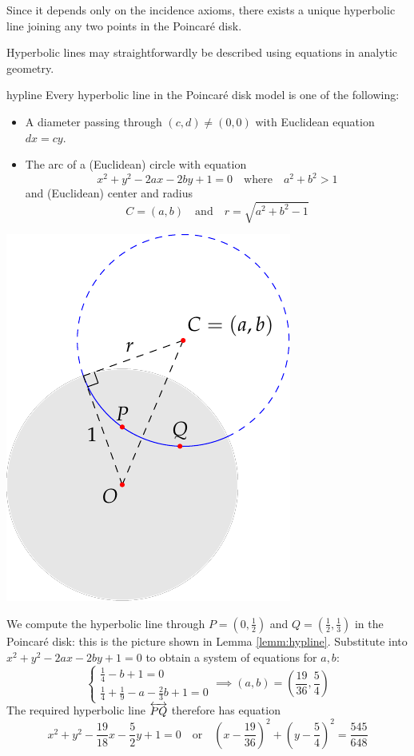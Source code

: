 Since it depends only on the incidence axioms, there exists a unique hyperbolic line joining any two points in the Poincaré disk.\par

Hyperbolic lines may straightforwardly be described using equations in analytic geometry.

\begin{lemm}[lower separated=false, sidebyside, sidebyside align=top seam, sidebyside gap=0pt, righthand width=0.35\linewidth]{}{hypline}
	Every hyperbolic line in the Poincaré disk model is one of the following:
	\begin{itemize}
	  \item A diameter passing through $(c,d)\neq (0,0)$ with Euclidean equation $dx=cy$.
	  \item The arc of a (Euclidean) circle with equation
		\[
			x^2+y^2-2ax-2by+1=0\quad\text{where}\quad a^2+b^2>1
		\]
		and (Euclidean) center and radius
		\[
			C=(a,b)\quad\text{and}\quad r=\sqrt{a^2+b^2-1}
		\]
	\end{itemize}
	\tcblower
	\flushright\includegraphics[scale=0.9]{models-example}
\end{lemm}
\goodbreak


\begin{example}{}{}
	We compute the hyperbolic line through $P=(0,\frac 12)$ and $Q=(\frac 12,\frac 13)$ in the Poincaré disk: this is the picture shown in Lemma \ref{lemm:hypline}.\smallbreak
	Substitute into $x^2+y^2-2ax-2by+1=0$ to obtain a system of equations for $a,b$:
	\[
		\begin{cases}
			\frac 14-b+1=0\\
			\frac 14+\frac 19-a-\frac 23b+1=0
		\end{cases}
		\implies (a,b)=\left(\frac{19}{36},\frac 54\right)
	\]
	The required hyperbolic line $\overleftrightarrow{PQ}$ therefore has equation
	\[
		x^2+y^2-\frac{19}{18}x-\frac{5}{2}y+1=0
		\quad\text{or}\quad
		\left(x-\frac{19}{36}\right)^2+\left(y-\frac 54\right)^2 =\frac{545}{648}
	\]
\end{example}

